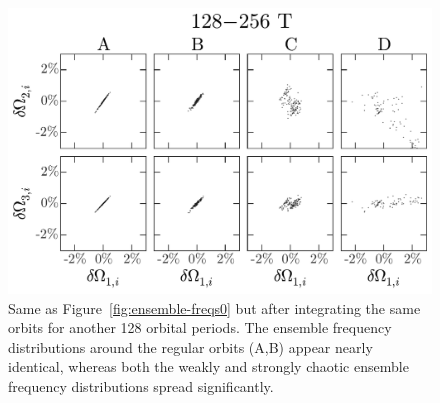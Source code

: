 \documentclass[letterpaper,12pt,preprint]{aastex}
\begin{document}
\clearpage
\begin{figure}[p]
\begin{center}
\includegraphics[width=\textwidth]{figures/ensemble-freqs-1.pdf}
\caption{Same as Figure~\ref{fig:ensemble-freqs0} but after integrating the same orbits for another 128 orbital periods. The ensemble frequency distributions around the regular orbits (A,B) appear nearly identical, whereas both the weakly and strongly chaotic ensemble frequency distributions spread significantly.} 
\label{fig:ensemble-freqs1}
\end{center}
\end{figure}
\end{document}
